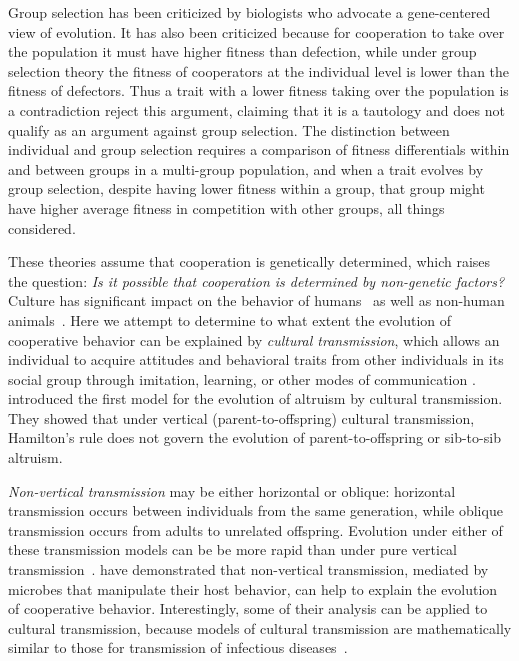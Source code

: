 \documentclass[12pt]{extarticle}
\begin{document}
Group selection has been criticized by biologists who advocate a gene-centered view of evolution. %
It has also been criticized because for cooperation to take over the population it must have higher fitness than defection, while under group selection theory the fitness of cooperators at the individual level is lower than the fitness of defectors. Thus a trait with a lower fitness taking over the population is a contradiction %
\citet{eldakar2011eight} reject this argument, claiming that it is a tautology and does not qualify as an argument against group selection. The distinction between individual and group selection requires a comparison of fitness differentials within and between groups in a multi-group population, and when a trait  evolves by group selection, despite having lower fitness within a group, that group might have higher average fitness in competition with other groups, all things considered. %



These theories assume that cooperation is genetically determined, which raises the question: \emph{Is it possible that cooperation is determined by non-genetic factors?}
Culture has significant impact on the behavior of humans~\citep{ihara2004cultural,jeong2018bronze} as well as non-human animals~\citep{bonner2018evolution}.
Here we attempt to determine to what extent the evolution of cooperative behavior can be explained by \emph{cultural transmission},
which allows an individual to acquire attitudes and behavioral traits from other individuals in its social group through imitation, learning, or other modes of communication \citep{cavalli1981cultural,richerson2008not}.
\citet{feldman1985gene} introduced the first model for the evolution of altruism by cultural transmission.
They showed that under vertical (parent-to-offspring) cultural transmission, Hamilton's rule does not govern the evolution of parent-to-offspring or sib-to-sib altruism.

\emph{Non-vertical transmission} may be either horizontal or oblique: horizontal transmission occurs between individuals from the same generation, while oblique transmission occurs from adults to unrelated offspring. 
Evolution under either of these transmission models  can be be more rapid than under pure vertical transmission~\citep{cavalli1981cultural,ram2018evolution}.
\citet{lewin2017microbes} have demonstrated that non-vertical transmission, mediated by microbes that manipulate their host behavior, can help to explain the evolution of cooperative behavior. Interestingly, some of their analysis can be applied to cultural transmission, because models of cultural transmission are mathematically similar to those for transmission of infectious diseases~\citep{cavalli1981cultural}.
\end{document}
